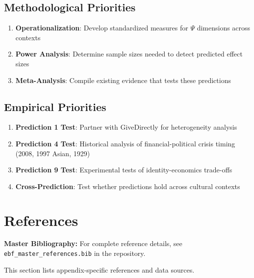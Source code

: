 \subsection{Methodological Priorities}

\begin{enumerate}
    \item \textbf{Operationalization}: Develop standardized measures for $\Psi$ dimensions across contexts
    \item \textbf{Power Analysis}: Determine sample sizes needed to detect predicted effect sizes
    \item \textbf{Meta-Analysis}: Compile existing evidence that tests these predictions
\end{enumerate}

\subsection{Empirical Priorities}

\begin{enumerate}
    \item \textbf{Prediction 1 Test}: Partner with GiveDirectly for heterogeneity analysis
    \item \textbf{Prediction 4 Test}: Historical analysis of financial-political crisis timing (2008, 1997 Asian, 1929)
    \item \textbf{Prediction 9 Test}: Experimental tests of identity-economics trade-offs
    \item \textbf{Cross-Prediction}: Test whether predictions hold across cultural contexts
\end{enumerate}


\section{References}
\label{sec:S-references}

\begin{tcolorbox}[colback=blue!5!white, colframe=blue!75!black]
\textbf{Master Bibliography:} For complete reference details, see
\texttt{ebf\_master\_references.bib} in the repository.

This section lists appendix-specific references and data sources.
\end{tcolorbox}

\vspace{0.5em}

